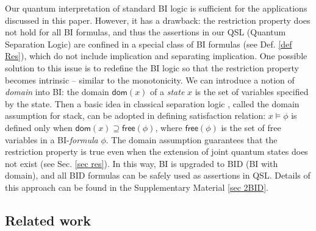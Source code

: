 \documentclass[conference,compsoc, 10pt]{IEEEtran}
\newcommand{\jh}[1]{\textit{\color{red}[JH] : #1}}
\newcommand{\lz}[1]{\textit{\color{blue}[LZ] : #1}}
\newcommand {\dom }[1] {{\mathsf{dom}\!\left(#1\right)}}
\newcommand {\free }[1] {{\mathsf{free}\left(#1\right)}}
\begin{document}
	Our quantum interpretation  of standard BI logic is sufficient for the applications discussed in this paper. 
	However, it has a drawback: 
 the restriction property does not hold for all BI formulas, and thus the assertions in our QSL (Quantum Separation Logic) are confined in a special class of BI formulas (see Def. \ref{def Res}), which do not include implication and separating implication. 
 One possible solution to this issue is to redefine the BI logic so that the  restriction property becomes intrinsic -- similar to the monotonicity. We can introduce a notion of \emph{domain} into BI: the domain $\dom{x}$ of a \textit{state} $x$ is the set of variables specified by the state. Then a  basic idea in classical separation logic \cite{Bro07,IO01,ORY01,OHe07}, called the domain assumption for stack, can be adopted in defining  satisfaction relation: $x\models \phi$ is defined only when $\dom{x}\supseteq\free{\phi}$, where $\free{\phi} $ is the set of free variables in a BI-\textit{formula} $\phi$. The domain assumption  guarantees that  the restriction property is true even when the extension of joint quantum states does not exist (see Sec. \ref{sec res}). In this way, BI is upgraded to BID (BI with domain), and all BID formulas can be safely used as assertions in QSL. Details of this approach can be found in the  Supplementary Material \ref{sec 2BID}.
	
	\subsection{Related work}
	
	\vspace{-0.05cm}
	
\end{document}

